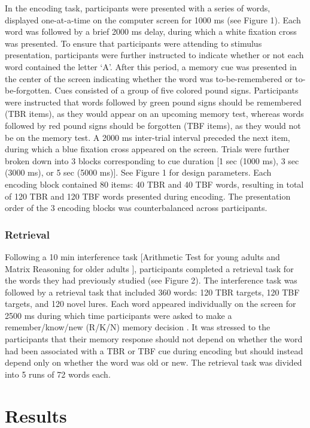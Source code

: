 \documentclass[man]{apa6}\usepackage[]{graphicx}\usepackage[]{color}
\begin{document}
In the encoding task, participants were presented with a series of words, displayed one-at-a-time on the computer screen for 1000 ms (see Figure 1). Each word was followed by a brief 2000 ms delay, during which a white fixation cross was presented. To ensure that participants were attending to stimulus presentation, participants were further instructed to indicate whether or not each word contained the letter ‘A’. After this period, a memory cue was presented in the center of the screen indicating whether the word was to-be-remembered or to-be-forgotten. Cues consisted of a group of five colored pound signs. Participants were instructed that words followed by green pound signs should be remembered (TBR items), as they would appear on an upcoming memory test, whereas words followed by red pound signs should be forgotten (TBF items), as they would not be on the memory test. A 2000 ms inter-trial interval preceded the next item, during which a blue fixation cross appeared on the screen. Trials were further broken down into 3 blocks corresponding to cue duration [1 sec (1000 ms), 3 sec (3000 ms), or 5 sec (5000 ms)]. See Figure 1 for design parameters. Each encoding block contained 80 items: 40 TBR and 40 TBF words, resulting in total of 120 TBR and 120 TBF words presented during encoding. The presentation order of the 3 encoding blocks was counterbalanced across participants.

\subsubsection*{Retrieval}

Following a 10 min interference task [Arithmetic Test for young adults and Matrix Reasoning for older adults \parencite{wais2008}], participants completed a retrieval task for the words they had previously studied (see Figure 2). The interference task was followed by a retrieval task that included 360 words: 120 TBR targets, 120 TBF targets, and 120 novel lures. Each word appeared individually on the screen for 2500 ms during which time participants were asked to make a remember/know/new (R/K/N) memory decision \parencite[see][for a review]{yonelinas.jacoby1995remknow}. It was stressed to the participants that their memory response should not depend on whether the word had been associated with a TBR or TBF cue during encoding but should instead depend only on whether the word was old or new. The retrieval task was divided into 5 runs of 72 words each.

\section*{Results}
\end{document}
